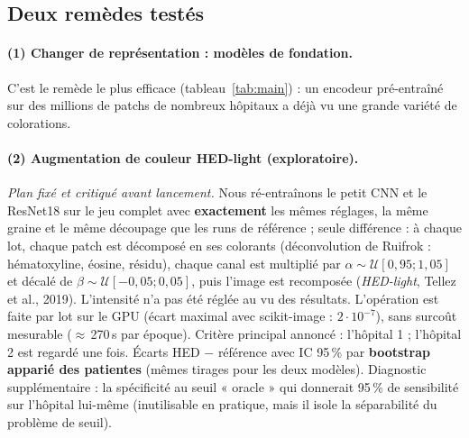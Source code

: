 \documentclass[11pt,a4paper]{article}
\begin{document}
\subsection{Deux remèdes testés}\label{sec:hed}
\paragraph{(1) Changer de représentation : modèles de fondation.} C'est le remède le plus efficace (tableau~\ref{tab:main}) : un
encodeur pré-entraîné sur des millions de patchs de nombreux hôpitaux a déjà vu une grande variété de colorations.

\paragraph{(2) Augmentation de couleur HED-light (exploratoire).}
\emph{Plan fixé et critiqué avant lancement.} Nous ré-entraînons le petit CNN et le ResNet18 sur le jeu complet avec
\textbf{exactement} les mêmes réglages, la même graine et le même découpage que les runs de référence ; seule différence : à chaque lot,
chaque patch est décomposé en ses colorants (déconvolution de Ruifrok : hématoxyline, éosine, résidu), chaque canal est multiplié par
$\alpha\sim\mathcal U[0{,}95 ; 1{,}05]$ et décalé de $\beta\sim\mathcal U[-0{,}05 ; 0{,}05]$, puis l'image est recomposée
(\emph{HED-light}, Tellez et al., 2019). L'intensité n'a pas été réglée au vu des résultats. L'opération est faite par lot sur le GPU
(écart maximal avec scikit-image : $2\cdot10^{-7}$), sans surcoût mesurable ($\approx$\,270\,s par époque).
Critère principal annoncé : l'hôpital 1 ; l'hôpital 2 est regardé une fois. Écarts HED $-$ référence avec IC 95\,\% par
\textbf{bootstrap apparié des patientes} (mêmes tirages pour les deux modèles). Diagnostic supplémentaire : la spécificité au seuil
« oracle » qui donnerait 95\,\% de sensibilité sur l'hôpital lui-même (inutilisable en pratique, mais il isole la séparabilité du
problème de seuil).
\end{document}
